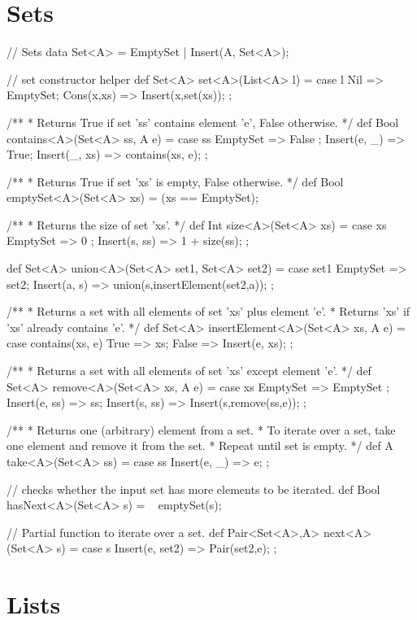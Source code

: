 \section{Sets}

\begin{abscode}
// Sets
data Set<A> = EmptySet | Insert(A, Set<A>);

// set constructor helper
def Set<A> set<A>(List<A> l) = 
    case l { 
       Nil => EmptySet; 
       Cons(x,xs) => Insert(x,set(xs)); 
    };

/**
 * Returns True if set 'ss' contains element 'e', False otherwise.
 */
def Bool contains<A>(Set<A> ss, A e) =
  case ss {
    EmptySet => False ;
    Insert(e, _) => True;
    Insert(_, xs) => contains(xs, e);
  };
  
/**
 * Returns True if set 'xs' is empty, False  otherwise.
 */
def Bool emptySet<A>(Set<A> xs) = (xs == EmptySet); 

/**
 * Returns the size of set 'xs'.
 */
def Int size<A>(Set<A> xs) = 
   case xs { 
      EmptySet => 0 ; 
      Insert(s, ss) => 1 + size(ss); 
   };

def Set<A> union<A>(Set<A> set1, Set<A> set2) =
   case set1 {
      EmptySet => set2;
      Insert(a, s) => union(s,insertElement(set2,a));
   }; 

/**
 * Returns a set with all elements of set 'xs' plus element 'e'.
 * Returns 'xs' if 'xs' already contains 'e'.
 */
def Set<A> insertElement<A>(Set<A> xs, A e) =
  case contains(xs, e) {
    True => xs;
    False => Insert(e, xs);
  };

/**
 * Returns a set with all elements of set 'xs' except element 'e'.
 */
def Set<A> remove<A>(Set<A> xs, A e) = 
  case xs {
     EmptySet => EmptySet ;
     Insert(e, ss) => ss;
     Insert(s, ss) => Insert(s,remove(ss,e));
  };

/**
 * Returns one (arbitrary) element from a set.
 * To iterate over a set, take one element and remove it from the set.
 * Repeat until set is empty.
 */
def A take<A>(Set<A> ss) =
  case ss {
    Insert(e, _) => e;
  };

// checks whether the input set has more elements to be iterated.
def Bool hasNext<A>(Set<A> s) = ~ emptySet(s); 

// Partial function to iterate over a set.
def Pair<Set<A>,A> next<A>(Set<A> s) = 
   case s { 
      Insert(e, set2) => Pair(set2,e); 
   };
\end{abscode}

\section{Lists}

